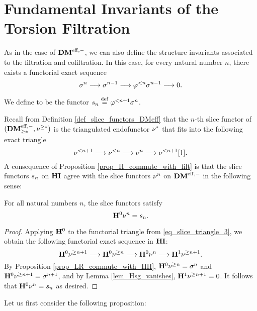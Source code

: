\section{Fundamental Invariants of the Torsion Filtration}

As in the case of $\mathbf{DM}^{\mathrm{eff},-}$, we can also define the structure 
invariants associated to the filtration and cofiltration. In this
case, for every natural number $n$, there exists a functorial 
exact sequence
\[
\sigma^{n} \longrightarrow \sigma^{n - 1} \longrightarrow \varphi^{< n}\sigma^{n - 1} \longrightarrow 0.
\]
\begin{defn}\label{defn_sliceHI}
We define  to be the functor
$s_n \stackrel{\mathrm{def}}{=} \varphi^{< n + 1}\sigma^{n}$.
\end{defn}

Recall from Definition \ref{def_slice_functors_DMeff} that the 
$n$-th slice functor of $(\mathbf{DM}^{\mathrm{eff},-}_{\geq *}, 
\nu^{\geq *})$ is the triangulated endofunctor $\nu^{*}$ that
fits into the following exact triangle
\[
\nu^{< n + 1} \longrightarrow \nu^{< n} \longrightarrow \nu^{n} \longrightarrow \nu^{< n + 1}[1].
\]
A consequence of Proposition \ref{prop_H_commute_with_filt} is 
that the slice functors $s_n$ on $\mathbf{HI}$ agree 
with the slice functors $\nu^{n}$ on $\mathbf{DM}^{\mathrm{eff},-}$ in the following
sense:

\begin{cor}\label{cor_H_commute_with_slice}
For all natural numbers $n$, the slice functors satisfy
\[
\mathbf{H}^0 \nu^{n} = s_n.
\]
\end{cor}
\begin{proof}
Applying $\mathbf{H}^0$ to the functorial triangle from 
\eqref{eq_slice_triangle_3}, we obtain the following functorial 
exact sequence in $\mathbf{HI}$:
\[
\mathbf{H}^0 \nu^{\geq n + 1} \longrightarrow \mathbf{H}^0 \nu^{\geq n} \longrightarrow \mathbf{H}^0 \nu^{n} 
   \longrightarrow \mathbf{H}^1 \nu^{\geq n + 1}.
\]
By Proposition \ref{prop_LR_commute_with_HH}, $\mathbf{H}^0 \nu^{\geq n} =
\sigma^{n}$ and $\mathbf{H}^0 \nu^{\geq n + 1} = \sigma^{n + 1}$, and by Lemma 
\ref{lem_Hsg_vanishes}, $\mathbf{H}^1\nu^{\geq n + 1} = 0$. It follows that
$\mathbf{H}^0 \nu^{n} = s_n$ as desired.
\end{proof}

Let us first consider the following proposition:

